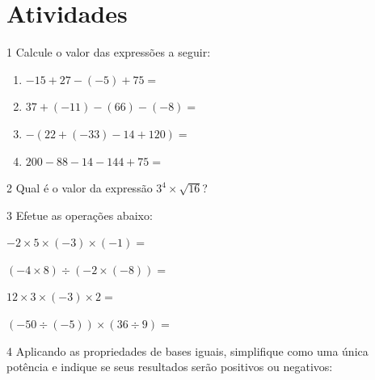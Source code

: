 \section*{Atividades}

\num{1} Calcule o valor das expressões a seguir: 

\begin{enumerate}[itemsep=-5mm]
    \item $- 15 + 27 - (- 5) + 75 = $ 

    \item $37 + (- 11) - (66) - ( - 8) =$

    \item $- (22 + ( - 33 ) - 14 + 120) =$

    \item $200 - 88 - 14 - 144 + 75 =$

\end{enumerate}


\num{2} Qual é o valor da expressão $3^4 \times \sqrt{16}$?


\reduline{\ \hfill}

\num{3} Efetue as operações abaixo:

\begin{escolha}[itemsep=0pt]

\item $- 2 \times 5 \times ( - 3 ) \times ( - 1 ) =$ 
\item $(- 4 \times 8) \div ( - 2 \times ( - 8 )) =$ 
\item $12 \times 3 \times ( - 3 ) \times 2 =$ 
\item $( - 50 \div ( - 5 )) \times (36 \div 9) =$ 

\end{escolha}


\num{4} Aplicando as propriedades de bases iguais, simplifique como uma única
potência e indique se seus resultados serão positivos ou negativos:
\enlargethispage{2\baselineskip}

